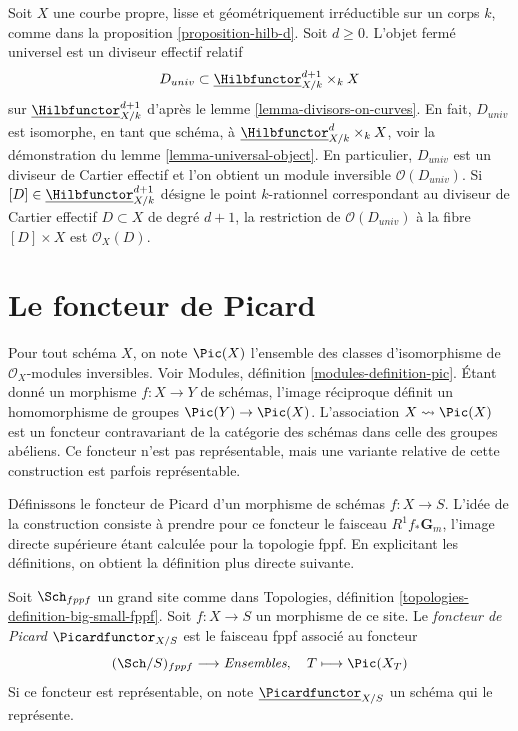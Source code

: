 \begin{remark}
\label{remark-universal-object-hilb-d}
Soit $X$ une courbe propre, lisse et géométriquement irréductible sur un corps $k$,
comme dans la proposition \ref{proposition-hilb-d}. Soit $d \geq 0$. L'objet
fermé universel est un diviseur effectif relatif
$$
D_{univ} \subset \underline{\Hilbfunctor}^{d + 1}_{X/k} \times_k X
$$
sur $\underline{\Hilbfunctor}^{d + 1}_{X/k}$ d'après le
lemme \ref{lemma-divisors-on-curves}.
En fait, $D_{univ}$ est isomorphe, en tant que schéma, à
$\underline{\Hilbfunctor}^d_{X/k} \times_k X$, voir la démonstration du
lemme \ref{lemma-universal-object}.
En particulier, $D_{univ}$ est un diviseur de Cartier effectif et
l'on obtient un module inversible
$\mathcal{O}(D_{univ})$. Si $[D] \in \underline{\Hilbfunctor}^{d + 1}_{X/k}$
désigne le point $k$-rationnel correspondant au diviseur de Cartier
effectif $D \subset X$ de degré $d + 1$, la restriction
de $\mathcal{O}(D_{univ})$ à la fibre $[D] \times X$ est
$\mathcal{O}_X(D)$.
\end{remark}


\section{Le foncteur de Picard}
\label{section-picard-functor}

\noindent
Pour tout schéma $X$, on note $\Pic(X)$ l'ensemble des classes
d'isomorphisme de $\mathcal{O}_X$-modules inversibles.
Voir Modules, définition \ref{modules-definition-pic}.
Étant donné un morphisme $f : X \to Y$ de schémas, l'image réciproque définit
un homomorphisme de groupes $\Pic(Y) \to \Pic(X)$.
L'association
$X \leadsto \Pic(X)$ est un foncteur contravariant de la catégorie
des schémas dans celle des groupes abéliens. Ce foncteur n'est pas
représentable, mais une variante relative de cette
construction est parfois représentable.

\medskip\noindent
Définissons le foncteur de Picard d'un morphisme de schémas $f : X \to S$.
L'idée de la construction consiste à prendre pour ce foncteur le faisceau
$R^1f_*\mathbf{G}_m$, l'image directe supérieure étant calculée pour
la topologie fppf. En explicitant les définitions, on obtient la définition
plus directe suivante.

\begin{definition}
\label{definition-picard-functor}
Soit $\Sch_{fppf}$ un grand site comme dans
Topologies, définition \ref{topologies-definition-big-small-fppf}.
Soit $f : X \to S$ un morphisme de ce site. Le {\it foncteur de Picard}
$\Picardfunctor_{X/S}$ est le faisceau fppf associé au foncteur
$$
(\Sch/S)_{fppf} \longrightarrow \textit{Ensembles},\quad
T \longmapsto \Pic(X_T)
$$
Si ce foncteur est représentable, on note
$\underline{\Picardfunctor}_{X/S}$ un schéma qui le représente.
\end{definition}

